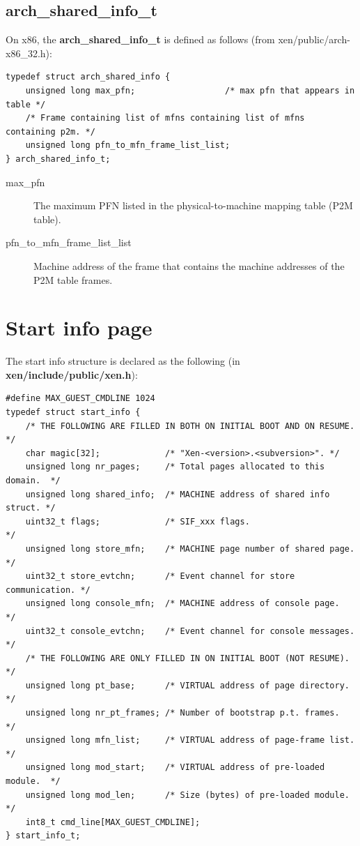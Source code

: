 \documentclass[11pt,twoside,final,openright]{report}
\begin{document}
\subsection{arch\_shared\_info\_t}

On x86, the {\bf arch\_shared\_info\_t} is defined as follows (from
xen/public/arch-x86\_32.h):

\scriptsize
\begin{verbatim}
typedef struct arch_shared_info {
    unsigned long max_pfn;                  /* max pfn that appears in table */
    /* Frame containing list of mfns containing list of mfns containing p2m. */
    unsigned long pfn_to_mfn_frame_list_list; 
} arch_shared_info_t;
\end{verbatim}
\normalsize

\begin{description}
\item[max\_pfn] The maximum PFN listed in the physical-to-machine
  mapping table (P2M table).
\item[pfn\_to\_mfn\_frame\_list\_list] Machine address of the frame
  that contains the machine addresses of the P2M table frames.
\end{description}

\section{Start info page}

The start info structure is declared as the following (in {\bf
xen/include/public/xen.h}):

\scriptsize
\begin{verbatim}
#define MAX_GUEST_CMDLINE 1024
typedef struct start_info {
    /* THE FOLLOWING ARE FILLED IN BOTH ON INITIAL BOOT AND ON RESUME.    */
    char magic[32];             /* "Xen-<version>.<subversion>". */
    unsigned long nr_pages;     /* Total pages allocated to this domain.  */
    unsigned long shared_info;  /* MACHINE address of shared info struct. */
    uint32_t flags;             /* SIF_xxx flags.                         */
    unsigned long store_mfn;    /* MACHINE page number of shared page.    */
    uint32_t store_evtchn;      /* Event channel for store communication. */
    unsigned long console_mfn;  /* MACHINE address of console page.       */
    uint32_t console_evtchn;    /* Event channel for console messages.    */
    /* THE FOLLOWING ARE ONLY FILLED IN ON INITIAL BOOT (NOT RESUME).     */
    unsigned long pt_base;      /* VIRTUAL address of page directory.     */
    unsigned long nr_pt_frames; /* Number of bootstrap p.t. frames.       */
    unsigned long mfn_list;     /* VIRTUAL address of page-frame list.    */
    unsigned long mod_start;    /* VIRTUAL address of pre-loaded module.  */
    unsigned long mod_len;      /* Size (bytes) of pre-loaded module.     */
    int8_t cmd_line[MAX_GUEST_CMDLINE];
} start_info_t;
\end{verbatim}
\normalsize
\end{document}

